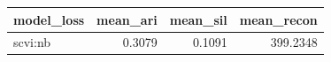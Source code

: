 \begin{tabular}{lrrr}
\toprule
model\_loss & mean\_ari & mean\_sil & mean\_recon \\
\midrule
scvi:nb & 0.3079 & 0.1091 & 399.2348 \\
\bottomrule
\end{tabular}
